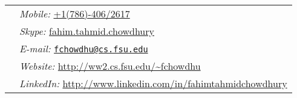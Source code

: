\documentclass[margin,line]{res}
\begin{document}

\begin{tabular}{@{}p{2.5in}p{4in}}
\hspace{1cm} & {\it Mobile:}  \href{tel:+17864062617}{+1(786)-406/2617} \\
\hspace{1cm} & {\it Skype:}  \href{skype:fahim.tahmid.chowdhury?call}{fahim.tahmid.chowdhury} \\
\hspace{1cm} & {\it E-mail:} \href{mailto:fchowdhu@cs.fsu.edu}{\nolinkurl{fchowdhu@cs.fsu.edu} } \\
\hspace{1cm} & {\it Website:} \href{http://ww2.cs.fsu.edu/~fchowdhu}{http://ww2.cs.fsu.edu/\textasciitilde fchowdhu} \\
\hspace{1cm} & {\it LinkedIn:} \href{http://www.linkedin.com/in/fahimtahmidchowdhury}{http://www.linkedin.com/in/fahimtahmidchowdhury} \\
\end{tabular}

\vspace*{-.2in}
\end{document}
